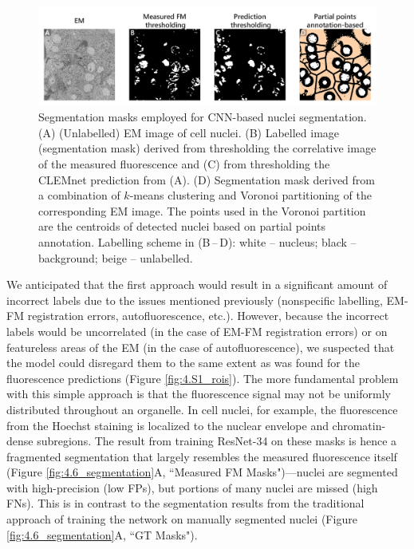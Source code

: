\begin{figure}[!tb]
    \centering
    \includegraphics[width=\linewidth]{chapter-4/figures_PDF/fig4-5_masks.pdf}
    \caption{Segmentation masks employed for CNN-based nuclei segmentation.
    (A) (Unlabelled) EM image of cell nuclei.
    (B) Labelled image (segmentation mask) derived from thresholding the correlative image of the measured fluorescence and (C) from thresholding the CLEMnet prediction from (A).
    (D) Segmentation mask derived from a combination of $k$-means clustering and Voronoi partitioning of the corresponding EM image. The points used in the Voronoi partition are the centroids of detected nuclei based on partial points annotation. Labelling scheme in (B\,--\,D): white -- nucleus; black -- background; beige -- unlabelled.}
    \label{fig:4.5_masks}
\end{figure}

We anticipated that the first approach would result in a significant amount of incorrect labels due to the issues mentioned previously (nonspecific labelling, EM-FM registration errors, autofluorescence, etc.). However, because the incorrect labels would be uncorrelated (in the case of EM-FM registration errors) or on featureless areas of the EM (in the case of autofluorescence), we suspected that the model could disregard them to the same extent as was found for the fluorescence predictions (Figure \ref{fig:4.S1_rois}). The more fundamental problem with this simple approach is that the fluorescence signal may not be uniformly distributed throughout an organelle. In cell nuclei, for example, the fluorescence from the Hoechst staining is localized to the nuclear envelope and chromatin-dense subregions. The result from training ResNet-34 on these masks is hence a fragmented segmentation that largely resembles the measured fluorescence itself (Figure \ref{fig:4.6_segmentation}A, ``Measured FM Masks")---nuclei are segmented with high-precision (low FPs), but portions of many nuclei are missed (high FNs). This is in contrast to the segmentation results from the traditional approach of training the network on manually segmented nuclei (Figure \ref{fig:4.6_segmentation}A, ``GT Masks").

